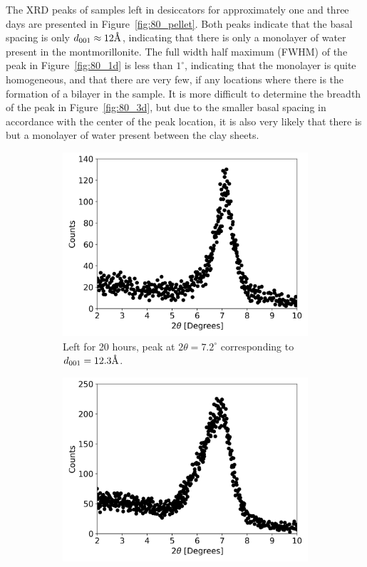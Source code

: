 The XRD peaks of samples left in desiccators for approximately one and three days are presented in Figure~\ref{fig:80_pellet}. Both peaks indicate that the basal spacing is only $d_{001}\approx 12\text{\normalfont\AA}$, indicating that there is only a monolayer of water present in the montmorillonite. The full width half maximum (FWHM) of the peak in Figure~\ref{fig:80_1d} is less than $1^\circ$, indicating that the monolayer is quite homogeneous, and that there are very few, if any locations where there is the formation of a bilayer in the sample. It is more difficult to determine the breadth of the peak in Figure~\ref{fig:80_3d}, but due to the smaller basal spacing in accordance with the center of the peak location, it is also very likely that there is but a monolayer of water present between the clay sheets.

\begin{figure}
	\centering
	\begin{subfigure}{.5\textwidth}
		\centering
		\includegraphics[scale=0.5]{images/97_plt_1d.png}
		\caption{Left for 20 hours, peak at $2\theta=7.2^\circ$ corresponding to $d_{001}=12.3\text{\normalfont\AA}$.}
		\label{fig:97_plt_1d}
	\end{subfigure}%
	\begin{subfigure}{.5\textwidth}
		\centering
		\includegraphics[scale=0.5]{images/97_plt_3d.png}

\end{subfigure}
\end{figure}
